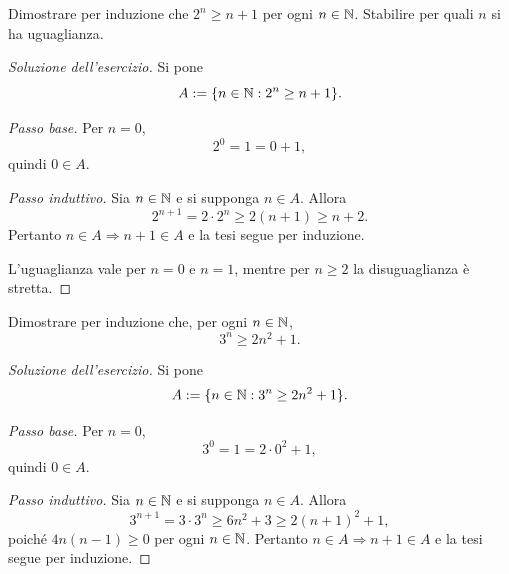 \begin{exercise}
\label{ex:fondamenti-potenza-indice}
Dimostrare per induzione che $2^n\ge n+1$ per ogni $n\in\mathbb{N}$.
Stabilire per quali $n$ si ha uguaglianza.
\end{exercise}
\begin{proof}[Soluzione dell'esercizio]
Si pone
\[
  A:=\{n\in\mathbb{N}:2^n\ge n+1\}.
\]

\emph{Passo base.} Per $n=0$,
\[
  2^0=1=0+1,
\]
quindi $0\in A$.

\emph{Passo induttivo.} Sia $n\in\mathbb{N}$ e si supponga $n\in A$. Allora
\[
  2^{n+1}=2\cdot2^n\ge2(n+1)\ge n+2.
\]
Pertanto $n\in A\Rightarrow n+1\in A$ e la tesi segue per induzione.

L'uguaglianza vale per $n=0$ e $n=1$, mentre per $n\ge2$
la disuguaglianza è stretta.
\end{proof}

\clearpage

\begin{exercise}
\label{ex:fondamenti-potenza-polinomio}
Dimostrare per induzione che, per ogni $n\in\mathbb{N}$,
\[
  3^n\ge2n^2+1.
\]
\end{exercise}
\begin{proof}[Soluzione dell'esercizio]
Si pone
\[
  A:=\{n\in\mathbb{N}:3^n\ge2n^2+1\}.
\]

\emph{Passo base.} Per $n=0$,
\[
  3^0=1=2\cdot0^2+1,
\]
quindi $0\in A$.

\emph{Passo induttivo.} Sia $n\in\mathbb{N}$ e si supponga $n\in A$. Allora
\[
  3^{n+1}=3\cdot3^n\ge6n^2+3\ge2(n+1)^2+1,
\]
poiché $4n(n-1)\ge0$ per ogni $n\in\mathbb{N}$.
Pertanto $n\in A\Rightarrow n+1\in A$ e la tesi segue per induzione.
\end{proof}

